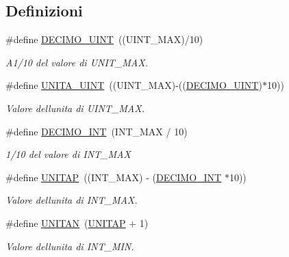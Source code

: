 \subsection*{Definizioni}
\begin{DoxyCompactItemize}
\item 
\#define \mbox{\hyperlink{a00050_af5bf75ca4c78ac29cde0cf581bbbba8c}{D\+E\+C\+I\+M\+O\+\_\+\+U\+I\+NT}}~((U\+I\+N\+T\+\_\+\+M\+AX)/10)
\begin{DoxyCompactList}\small\item\em A1/10 del valore di U\+N\+I\+T\+\_\+\+M\+AX. \end{DoxyCompactList}\item 
\#define \mbox{\hyperlink{a00050_a9bc472230cb9c73d7e6481638c4097ff}{U\+N\+I\+T\+A\+\_\+\+U\+I\+NT}}~((U\+I\+N\+T\+\_\+\+M\+AX)-\/((\mbox{\hyperlink{a00050_af5bf75ca4c78ac29cde0cf581bbbba8c}{D\+E\+C\+I\+M\+O\+\_\+\+U\+I\+NT}})$\ast$10))
\begin{DoxyCompactList}\small\item\em Valore dell\textquotesingle{}unita\textquotesingle{} di U\+I\+N\+T\+\_\+\+M\+AX. \end{DoxyCompactList}\item 
\#define \mbox{\hyperlink{a00050_a3ac31ce35ba8dcc4af19c8045ef22e41}{D\+E\+C\+I\+M\+O\+\_\+\+I\+NT}}~(I\+N\+T\+\_\+\+M\+AX / 10)
\begin{DoxyCompactList}\small\item\em 1/10 del valore di I\+N\+T\+\_\+\+M\+AX \end{DoxyCompactList}\item 
\#define \mbox{\hyperlink{a00050_af7ea7ff0e1cdd41a4b679e08a26225ce}{U\+N\+I\+T\+AP}}~((I\+N\+T\+\_\+\+M\+AX) -\/ (\mbox{\hyperlink{a00050_a3ac31ce35ba8dcc4af19c8045ef22e41}{D\+E\+C\+I\+M\+O\+\_\+\+I\+NT}} $\ast$10))
\begin{DoxyCompactList}\small\item\em Valore dell\textquotesingle{}unita\textquotesingle{} di I\+N\+T\+\_\+\+M\+AX. \end{DoxyCompactList}\item 
\#define \mbox{\hyperlink{a00050_a2cfda22a0f5fbd983311abc2796ad3f4}{U\+N\+I\+T\+AN}}~(\mbox{\hyperlink{a00050_af7ea7ff0e1cdd41a4b679e08a26225ce}{U\+N\+I\+T\+AP}} + 1)
\begin{DoxyCompactList}\small\item\em Valore dell\textquotesingle{}unita\textquotesingle{} di I\+N\+T\+\_\+\+M\+IN. \end{DoxyCompactList}\item 

\end{DoxyCompactItemize}

